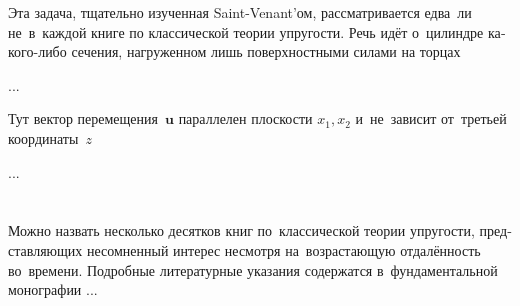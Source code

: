 
\label{para:twistingofrods.saintvenant}

\begin{otherlanguage}{russian}

Эта задача, тщательно изученная Saint\hbox{-\hspace{-0.2ex}}Venant’ом, рассматривается едва~ли не~в~каждой книге по классической теории упругости. Речь идёт о~цилиндре какого\hbox{-}либо сечения, нагруженном лишь поверхностными силами на торцах

...



\end{otherlanguage}



\label{para:planedeformation.linearclassicalelasticity}

\begin{otherlanguage}{russian}

Тут вектор перемещения~$\bm{u}$ параллелен плоскости ${x_1, x_2}$ и~не~зависит от~третьей координаты~$z$

...



\end{otherlanguage}

\vspace{8mm}
\hfill\begin{minipage}[b]{0.95\linewidth}
\fontsize{10}{12}\selectfont

\section*{\wordforbibliography}

\begin{otherlanguage}{russian}

Можно назвать несколько десятков книг по~классической теории упругости, представляющих несомненный интерес несмотря на~возрастающую отдалённость во~времени. Подробные литературные указания содержатся в~фундаментальной монографии ...

\end{otherlanguage}

\end{minipage}
